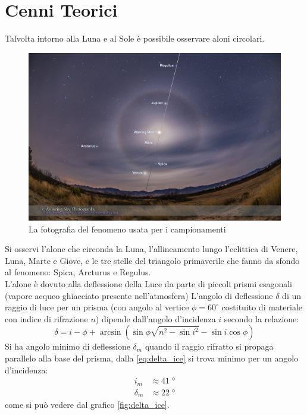 \documentclass{report}[a4paper,11pt]
\begin{document}
\section{Cenni Teorici}
Talvolta intorno alla Luna e al Sole \`e possibile osservare aloni circolari.
\begin{figure}[htb!]
  \centering
    \includegraphics[width=\linewidth]{./figs/lunar-halo.jpg}
  \caption{La fotografia del fenomeno usata per i campionamenti}
\end{figure}
Si osservi l'alone che circonda la Luna, l'allineamento lungo l'eclittica di Venere, Luna, Marte e Giove, e le tre stelle del triangolo primaverile che fanno da sfondo al fenomeno: Spica, Arcturus e Regulus.\\
L'alone \`e dovuto alla deflessione della Luce da parte di piccoli prismi esagonali (vapore acqueo ghiacciato presente nell'atmosfera)
L'angolo di deflessione $\delta$ di un raggio di luce per un prisma (con angolo al vertice $\phi = 60^\circ$ costituito di materiale con indice di rifrazione $n$) dipende dall'angolo d'incidenza $i$ secondo la relazione:
\begin{equation}\label{eq:delta_ice}
\delta = i - \phi + \arcsin{\left( \sin{\phi} \sqrt{n^2 - \sin{i}^2} - \sin{i} \cos{\phi} \right)}
\end{equation}
Si ha angolo minimo di deflessione $\delta_m$ quando il raggio rifratto si propaga parallelo alla base del prisma, dalla \eqref{eq:delta_ice} si trova minimo per un angolo d'incidenza:
\begin{align}
i_m &\approx 41 \; \si{\degree} \\
\delta_m &\approx 22 \; \si{\degree}
\end{align}
come si può vedere dal grafico \ref{fig:delta_ice}.
\end{document}
